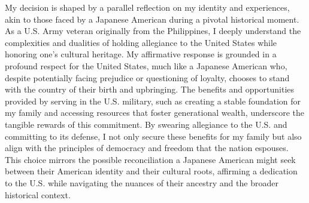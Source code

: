 \documentclass[12pt]{article}
\begin{document}
My decision is shaped by a parallel reflection on my identity and experiences, akin to those faced by a Japanese American during a pivotal historical moment. As a U.S. Army veteran originally from the Philippines, I deeply understand the complexities and dualities of holding allegiance to the United States while honoring one's cultural heritage. My affirmative response is grounded in a profound respect for the United States, much like a Japanese American who, despite potentially facing prejudice or questioning of loyalty, chooses to stand with the country of their birth and upbringing. The benefits and opportunities provided by serving in the U.S. military, such as creating a stable foundation for my family and accessing resources that foster generational wealth, underscore the tangible rewards of this commitment. By swearing allegiance to the U.S. and committing to its defense, I not only secure these benefits for my family but also align with the principles of democracy and freedom that the nation espouses. This choice mirrors the possible reconciliation a Japanese American might seek between their American identity and their cultural roots, affirming a dedication to the U.S. while navigating the nuances of their ancestry and the broader historical context.
\end{document}
